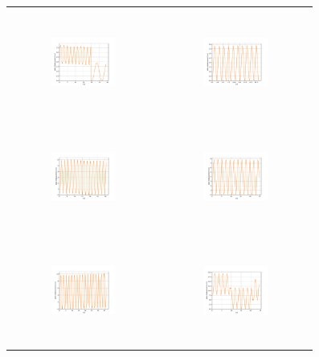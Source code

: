 \begin{figure}[H]
\begin{center}
\begin{tabular}{cc}
\includegraphics[width=0.45\textwidth, height=3.5cm]{graph/omega=1.00_A=1_plate.pdf}
&
\includegraphics[width=0.45\textwidth, height=3.5cm]{graph/omega=1.00_A=2_plate.pdf}\\
\includegraphics[width=0.45\textwidth, height=3.5cm]{graph/omega=1.00_A=3_plate.pdf}
&
\includegraphics[width=0.45\textwidth, height=3.5cm]{graph/omega=1.00_A=4_plate.pdf}\\
\includegraphics[width=0.45\textwidth, height=3.5cm]{graph/omega=1.00_A=5_plate.pdf}
&
\includegraphics[width=0.45\textwidth, height=3.5cm]{graph/omega=1.00_A=6_plate.pdf}\\

\end{tabular}
\end{center}
\end{figure}
